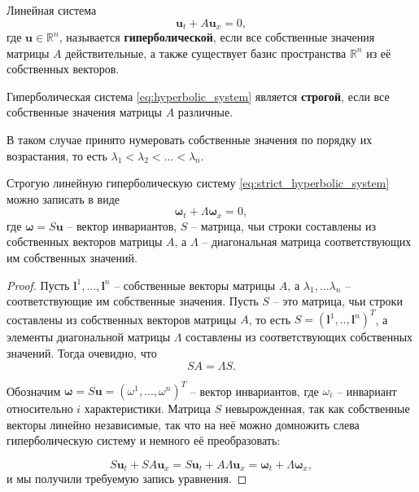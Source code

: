 \documentclass{article}
\begin{document}
\begin{define}\label{eq:hyperbolic_system}
	Линейная система \[\boldsymbol u_t+A\boldsymbol u_x=0,\]
	где $\boldsymbol u\in \mathbb R^n$, называется
	\textbf{гиперболической}, если все собственные значения матрицы $A$
	действительные, а также существует базис пространства $\mathbb R^n$
	из её собственных векторов.
\end{define}

\begin{define}\label{eq:strict_hyperbolic_system}
	Гиперболическая система \eqref{eq:hyperbolic_system} является
	\textbf{строгой}, если все собственные значения матрицы $A$ различные.
\end{define}

В таком случае принято нумеровать собственные значения по порядку их
возрастания, то есть $\lambda_1<\lambda_2<...<\lambda_n$.

\begin{lemma}\label{eq:hyperbolic_invariant_form}
	Строгую линейную гиперболическую систему
	\eqref{eq:strict_hyperbolic_system} можно записать в виде
	\[\boxed{\boldsymbol\omega_t+\Lambda\boldsymbol\omega_x=0},\]
	где $\boldsymbol\omega=S\boldsymbol u$ -- вектор инвариантов, $S$ --
	матрица, чьи строки составлены из собственных векторов матрицы $A$,
	а $\Lambda$ -- диагональная матрица соответствующих им собственных
	значений.
\end{lemma}

\begin{proof}
	Пусть $\boldsymbol l^1,...,\boldsymbol l^n$ -- собственные векторы
	матрицы $A$, а $\lambda_1,...\lambda_n$ -- соответствующие им
	собственные значения. Пусть $S$ -- это матрица, чьи строки составлены из
	собственных векторов матрицы $A$, то есть $S=(\boldsymbol l^1,..,
	\boldsymbol l^n)^T$, а элементы диагональной матрицы $\Lambda$
	составлены из соответствующих собственных значений. Тогда очевидно, что
	\[SA=\Lambda S.\]

	Обозначим $\boldsymbol\omega=S\boldsymbol u=(\omega^1,...,\omega^n)^T$
	-- вектор инвариантов, где $\omega_i$ -- инвариант относительно $i$
	характеристики. Матрица $S$ невырожденная, так как собственные векторы
	линейно независимые, так что на неё можно домножить слева
	гиперболическую систему и немного её преобразовать:

	\[S\boldsymbol u_t+SA\boldsymbol u_x=S\boldsymbol u_t+A\Lambda
	\boldsymbol u_x=\boldsymbol\omega_t+\Lambda\boldsymbol\omega_x,\]
	и мы получили требуемую запись уравнения.
\end{proof}
\end{document}
